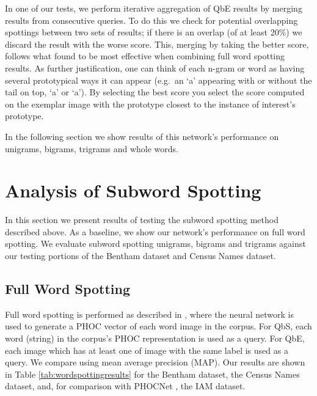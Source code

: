 \documentclass[ms,electronic,twosidetoc,letterpaper,chaptercenter,parttop,lol,lof,lot]{byumsphd}
\begin{document}
In one of our tests, we perform iterative aggregation of QbE results by merging results from consecutive queries. To do this we check for potential overlapping spottings between two sets of results; if there is an overlap (of at least 20\%) we discard the result with the worse score. This, merging by taking the better score, follows what \cite{Zagoris2015} found to be most effective when combining full word spotting results. As further justification, one can think of each n-gram or word as having several prototypical ways it can appear (e.g.~an `a' appearing with or without the tail on top, `\textsf{a}' or `{\selectfont\footnotesize a}'). By selecting the best score you select the score computed on the exemplar image with the prototype closest to the instance of interest's prototype.

In the following section we show results of this network's performance on unigrams, bigrams, trigrams and whole words.


\section{Analysis of Subword Spotting}

In this section we present results of testing the subword spotting method described above.
As a baseline, we show our network's performance on full word spotting. We evaluate subword spotting unigrams, bigrams and trigrams against our testing portions of the Bentham dataset and Census Names dataset. 

\subsection{Full Word Spotting}

Full word spotting is performed as described in \cite{sudholt2016}, where the neural network is used to generate a PHOC vector of each word image in the corpus. For QbS, each word (string) in the corpus's PHOC representation is used as a query. For QbE, each image which has at least one of image with the same label is used as a query. We compare using mean average precision (MAP). Our results are shown in Table \ref{tab:wordspottingresults} for the Bentham dataset, the Census Names dataset, and, for comparison with PHOCNet \cite{sudholt2016,sudholt2017}, the IAM dataset.
\end{document}
